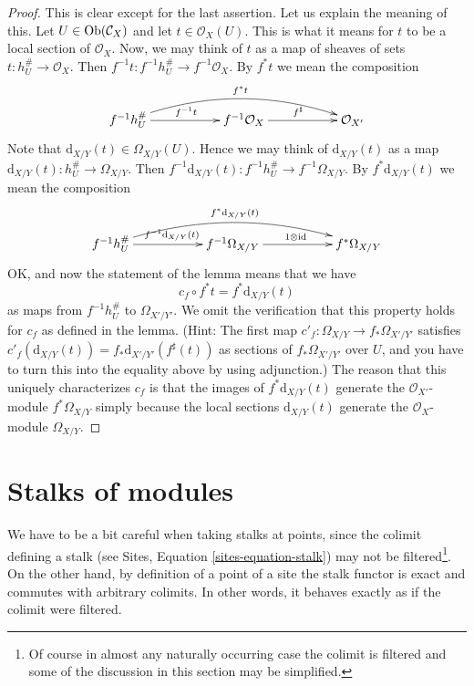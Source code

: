 \begin{proof}
This is clear except for the last assertion. Let us explain the meaning of
this. Let $U \in \mathop{\rm Ob}\nolimits(\mathcal{C}_X)$ and let $t \in \mathcal{O}_X(U)$.
This is what it means for $t$ to be a local section of $\mathcal{O}_X$.
Now, we may think of $t$ as a map of sheaves of sets
$t : h_U^\# \to \mathcal{O}_X$. Then
$f^{-1}t : f^{-1}h_U^\# \to f^{-1}\mathcal{O}_X$. By $f^*t$ we mean
the composition
$$
\xymatrix{
f^{-1}h_U^\# \ar[rr]^{f^{-1}t} \ar@/^4ex/[rrrr]^{f^*t} & &
f^{-1}\mathcal{O}_X \ar[rr]^{f^\sharp} & &
\mathcal{O}_{X'}
}
$$
Note that $\text{d}_{X/Y}(t) \in \Omega_{X/Y}(U)$. Hence we may think of
$\text{d}_{X/Y}(t)$ as a map $\text{d}_{X/Y}(t) : h_U^\# \to \Omega_{X/Y}$.
Then $f^{-1}\text{d}_{X/Y}(t) : f^{-1}h_U^\# \to f^{-1}\Omega_{X/Y}$.
By $f^*\text{d}_{X/Y}(t)$ we mean the composition
$$
\xymatrix{
f^{-1}h_U^\#
\ar[rr]^{f^{-1}\text{d}_{X/Y}(t)}
\ar@/^4ex/[rrrr]^{f^*\text{d}_{X/Y}(t)} & &
f^{-1}\Omega_{X/Y} \ar[rr]^{1 \otimes \text{id}} & &
f^*\Omega_{X/Y}
}
$$
OK, and now the statement of the lemma means that we have
$$
c_f \circ f^*t = f^*\text{d}_{X/Y}(t)
$$
as maps from $f^{-1}h_U^\#$ to $\Omega_{X'/Y'}$. We omit the verification
that this property holds for $c_f$ as defined in the lemma. (Hint: The first
map $c'_f : \Omega_{X/Y} \to f_*\Omega_{X'/Y'}$ satisfies
$c'_f(\text{d}_{X/Y}(t)) = f_*\text{d}_{X'/Y'}(f^\sharp(t))$ as sections of
$f_*\Omega_{X'/Y'}$ over $U$, and you have to
turn this into the equality above by using adjunction.)
The reason that this uniquely characterizes $c_f$ is that the images
of $f^*\text{d}_{X/Y}(t)$ generate the $\mathcal{O}_{X'}$-module
$f^*\Omega_{X/Y}$ simply because the local sections $\text{d}_{X/Y}(t)$
generate the $\mathcal{O}_X$-module $\Omega_{X/Y}$.
\end{proof}









\section{Stalks of modules}
\label{section-stalks}

\noindent
We have to be a bit careful when taking stalks at points,
since the colimit defining a stalk (see
Sites, Equation \ref{sites-equation-stalk})
may not be filtered\footnote{Of course in almost any naturally occurring
case the colimit is filtered and some of the discussion in this section
may be simplified.}. On the other hand, by definition of a point of a site
the stalk functor is exact and commutes with arbitrary colimits.
In other words, it behaves exactly as if the colimit were filtered.

